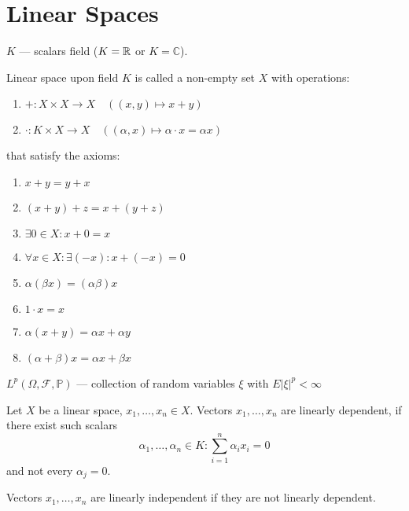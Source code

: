 \section{Linear Spaces}

$K$ --- scalars field ($K = \mathbb{R}$ or $K = \mathbb{C}$). 

\begin{definition}
  Linear space upon field $K$ is called a non-empty set $X$ with operations:
  \begin{enumerate}
    \item $+: X \times X \to  X \quad \left( (x, y) \mapsto x + y \right) $
    \item $\cdot: K \times X \to  X \quad \left( (\alpha, x) \mapsto \alpha \cdot x = \alpha x \right) $
  \end{enumerate}
  that satisfy the axioms:
  \begin{enumerate}
    \item $x + y = y + x$ 
    \item $(x + y) + z = x + (y + z)$ 
    \item $\exists 0 \in X: x + 0 = x$ 
    \item $\forall x \in X: \exists (-x): x + (-x) = 0$
    \item $\alpha(\beta x) = (\alpha \beta) x$ 
    \item $1 \cdot x = x$ 
    \item $\alpha (x + y) = \alpha x + \alpha y$ 
    \item $(\alpha + \beta) x = \alpha x + \beta x$
  \end{enumerate}
\end{definition}

\begin{example}
  $L^{p}(\Omega, \mathcal{F}, \mathbb{P})$ --- collection of random variables $\xi$ with $E\left| \xi \right|^{p}< \infty$
\end{example}


\begin{definition}
  Let $X$ be a linear space, $x_1, \ldots, x_n \in  X$. Vectors $x_1, \ldots, x_n$ are linearly dependent, if there exist such scalars \[ 
\alpha_1, \ldots, \alpha_n \in K: \sum_{i=1}^{n} \alpha_i x_i = 0
  \]
  and not every $\alpha_j = 0$.
\end{definition}

\begin{definition}
Vectors $x_1, \ldots, x_n$ are linearly independent if they are not linearly dependent.
\end{definition}

